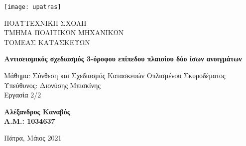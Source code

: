 \pagestyle{empty}
\begin{titlepage}
	\begin{center}

		\vspace*{0cm}

		\texttt{[image: upatras]}

		\normalsize
		{ΠΟΛΥΤΕΧΝΙΚΗ ΣΧΟΛΗ\\ΤΜΗΜΑ ΠΟΛΙΤΙΚΩΝ ΜΗΧΑΝΙΚΩΝ\\ΤΟΜΕΑΣ ΚΑΤΑΣΚΕΥΩΝ}

		\vspace{4.5cm}

		\large
		\textbf{Αντισεισμικός σχεδιασμός 3-όροφου επίπεδου πλαισίου δύο ίσων ανοιγμάτων}

		\vspace{3cm}

		\normalsize
		{Μάθημα: Σύνθεση και Σχεδιασμός Κατασκευών Οπλισμένου Σκυροδέματος\\Υπεύθυνος: Διονύσης Μπισκίνης\\Εργασία 2/2}

		\vspace{3cm}

		\large
		\textbf{Αλέξανδρος Καναβός\\Α.Μ.: 1034637}

		\vfill

		\normalsize
		{Πάτρα, Μάιος 2021}

	\end{center}
\end{titlepage}
